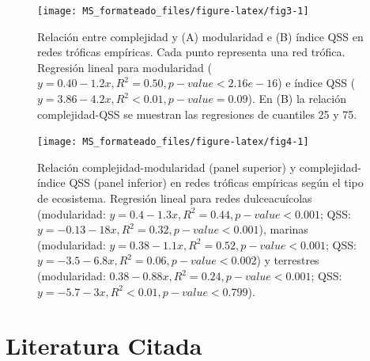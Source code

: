 \documentclass[
]{article}
\begin{document}
\newpage
\begin{figure}

{\centering \texttt{[image: MS\_formateado\_files/figure-latex/fig3-1]} 

}

\caption{Relación entre complejidad y (A) modularidad e (B) índice QSS en redes tróficas empíricas. Cada punto representa una red trófica. Regresión lineal para modularidad ($y = 0.40 - 1.2x, R^2 = 0.50, p-value < 2.16e-16$) e índice QSS ($y = 3.86 - 4.2x, R^2 < 0.01, p-value = 0.09$). En (B) la relación complejidad-QSS se muestran las regresiones de cuantiles 25 y 75.}\label{fig:fig3}
\end{figure}

\newpage
\begin{figure}

{\centering \texttt{[image: MS\_formateado\_files/figure-latex/fig4-1]} 

}

\caption{Relación complejidad-modularidad (panel superior) y complejidad-índice QSS (panel inferior) en redes tróficas empíricas según el tipo de ecosistema. Regresión lineal para redes dulceacuícolas (modularidad: $y = 0.4 - 1.3x, R^2 = 0.44, p-value < 0.001$; QSS: $y = - 0.13 - 18x, R^2 = 0.32, p-value < 0.001$), marinas (modularidad: $y = 0.38 - 1.1x, R^2 = 0.52, p-value < 0.001$; QSS: $y = - 3.5 - 6.8x, R^2 = 0.06, p-value < 0.002$) y terrestres (modularidad: $0.38 - 0.88x, R^2 = 0.24, p-value < 0.001$; QSS: $y = - 5.7 - 3x, R^2 < 0.01, p-value < 0.799$).}\label{fig:fig4}
\end{figure}

\hypertarget{literatura-citada}{%
\section*{Literatura Citada}\label{literatura-citada}}
\end{document}
